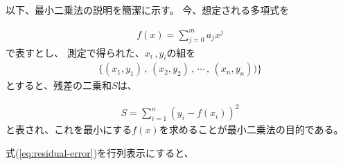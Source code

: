 \documentclass[titlepage]{jsreport}
\begin{document}
{{{以下、最小二乗法の説明を簡潔に示す。
今、想定される多項式を

\large
\begin{eqnarray}
f(x)=\sum_{j=0}^m a_jx^j \nonumber
\end{eqnarray}
\normalsize
で表すとし、
測定で得られた、$x_i$\,,\,$y_i$の組を
\large
\begin{eqnarray}
\{(x_1,y_1)\,,\,(x_2,y_2)\,,\,\cdots\,,\,(x_n,y_n)) \}\nonumber
\end{eqnarray}
\normalsize
とすると、残差の二乗和$S$は、

\large
\begin{eqnarray}
S=\sum_{i=1}^n (y_i-f(x_i))^2\label{eq:residual-error}
\end{eqnarray}
\normalsize
と表され、これを最小にする$f(x)$を求めることが最小二乗法の目的である。


式(\ref{eq:residual-error})を行列表示にすると、

}}}
\end{document}
